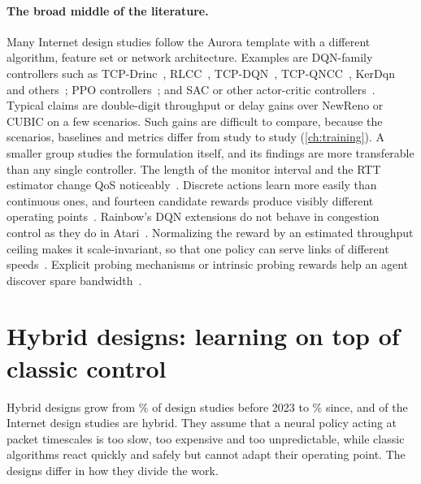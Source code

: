 \paragraph{The broad middle of the literature.} Many Internet design studies follow the Aurora template with a different algorithm, feature set or network architecture. Examples are DQN-family controllers such as TCP-Drinc~\cite{xiao2019drinc}, RLCC~\cite{xia2021rlcc}, TCP-DQN~\cite{wang2021intelligent}, TCP-QNCC~\cite{huang2023tcp}, KerDqn~\cite{xu2024kerdqn} and others~\cite{aglamazlar2025deep,aoki2026performance}; PPO controllers~\cite{li2020tcp,huang2022tcp,shi2023intelligent,yuan2023research}; and SAC or other actor-critic controllers~\cite{guo2022deep,xing2025reinforcement,blokhin2024deep}. Typical claims are double-digit throughput or delay gains over NewReno or CUBIC on a few scenarios. Such gains are difficult to compare, because the scenarios, baselines and metrics differ from study to study (\cref{ch:training}). A smaller group studies the formulation itself, and its findings are more transferable than any single controller. The length of the monitor interval and the RTT estimator change QoS noticeably~\cite{naqvi2023fine}. Discrete actions learn more easily than continuous ones, and fourteen candidate rewards produce visibly different operating points~\cite{kiarie2025design}. Rainbow's DQN extensions do not behave in congestion control as they do in Atari~\cite{martins2021rainbow}. Normalizing the reward by an estimated throughput ceiling makes it scale-invariant, so that one policy can serve links of different speeds~\cite{chae2025ackurate,chae2026pacemaker}. Explicit probing mechanisms or intrinsic probing rewards help an agent discover spare bandwidth~\cite{li2021tcp,han2026learn}.

\section{Hybrid designs: learning on top of classic control}
\label{sec:hybrid}

Hybrid designs grow from \nPctHybridPre\% of design studies before 2023 to \nPctHybridPost\% since, and \nChInternetHybrid{} of the \nChInternetDesign{} Internet design studies are hybrid. They assume that a neural policy acting at packet timescales is too slow, too expensive and too unpredictable, while classic algorithms react quickly and safely but cannot adapt their operating point. The designs differ in how they divide the work.

